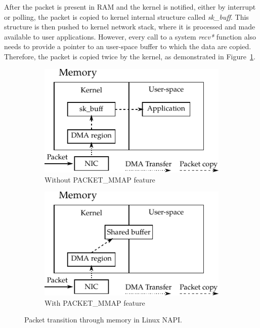 After the packet is present in RAM and the kernel is notified, either by interrupt or polling, the packet is copied to kernel internal structure called \emph{sk\_buff}. This structure is then pushed to kernel network stack, where it is processed and made available to user applications. However, every call to a system \emph{recv*} function also needs to provide a pointer to an user-space buffer to which the data are copied. Therefore, the packet is copied twice by the kernel, as demonstrated in Figure~\ref{fig:NAPI_no_MMAP}.

\begin{figure}[!tb]
    \centering
    \begin{subfigure}[t]{0.5\textwidth}
        \includegraphics{figures/c05/NAPI}
        \caption{Without PACKET\_MMAP feature}
        \label{fig:NAPI_no_MMAP}
    \end{subfigure}%
    \begin{subfigure}[t]{0.5\textwidth}
        \includegraphics{figures/c05/NAPI_MMAP}
        \caption{With PACKET\_MMAP feature}
        \label{fig:NAPI_MMAP}
    \end{subfigure}
    \caption{Packet transition through memory in Linux NAPI.}
    \label{fig:NAPI}
\end{figure}

